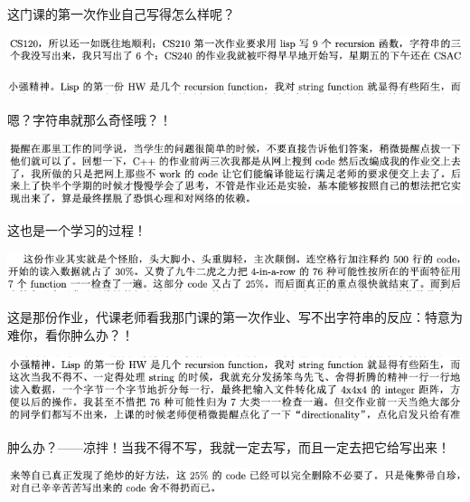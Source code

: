 \documentclass[9pt, b5paper]{article}
\begin{document}
这门课的第一次作业自己写得怎么样呢？

\begin{center}
\includegraphics[width=.9\linewidth]{./pic/backups_plans_20210501_214201.png}
\end{center}

\begin{center}
\includegraphics[width=.9\linewidth]{./pic/backups_plans_20210501_214052.png}
\end{center}

嗯？字符串就那么奇怪哦？！

\begin{center}
\includegraphics[width=.9\linewidth]{./pic/backups_plans_20210502_113933.png}
\end{center}

这也是一个学习的过程！

\begin{center}
\includegraphics[width=.9\linewidth]{./pic/backups_plans_20210502_114133.png}
\end{center}

这是那份作业，代课老师看我那门课的第一次作业、写不出字符串的反应：特意为难你，看你肿么办？！

\begin{center}
\includegraphics[width=.9\linewidth]{./pic/backups_plans_20210502_130207.png}
\end{center}

肿么办？——凉拌！当我不得不写，我就一定去写，而且一定去把它给写出来！

\begin{center}
\includegraphics[width=.9\linewidth]{./pic/backups_plans_20210502_114220.png}
\end{center}
\end{document}
